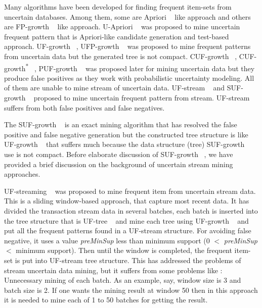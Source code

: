 \documentclass[conference]{IEEEtran}
\begin{document}
Many algorithms have been developed for finding frequent item-sets from uncertain databases. Among them, some are Apriori ~\cite{DBLP:conf/vldb/AgrawalS94} like approach and others are FP-growth ~\cite{DBLP:journals/datamine/HanPYM04} like approach. U-Apriori ~\cite{DBLP:journals/tkde/ZhaoYN14} was proposed to mine uncertain frequent pattern that is Apriori-like candidate generation and test-based approach. UF-growth ~\cite{DBLP:conf/kdd/GadeWK04}, UFP-growth ~\cite{DBLP:conf/kdd/AggarwalLWW09} was proposed to mine frequent patterns from uncertain data but the generated tree is not compact. CUF-growth ~\cite{DBLP:conf/dasfaa/LeungT12}, CUF-growth\textsuperscript{*} ~\cite{DBLP:conf/dasfaa/LeungT12}, PUF-growth ~\cite{DBLP:conf/pakdd/LeungT13} was proposed later for mining uncertain data but they produce false positives as they work with probabilistic uncertainty modeling. All of them are unable to mine stream of uncertain data. UF-stream ~\cite{DBLP:conf/icde/LeungH09} and SUF-growth ~\cite{DBLP:conf/icde/LeungH09} proposed to mine uncertain frequent pattern from stream. UF-stream ~\cite{DBLP:conf/icde/LeungH09} suffers from both false positives and false negatives. 

The SUF-growth ~\cite{DBLP:conf/icde/LeungH09} is an exact mining algorithm that has resolved the false positive and false negative generation but the constructed tree structure is like UF-growth ~\cite{DBLP:conf/kdd/GadeWK04} that suffers much because the data structure (tree) SUF-growth ~\cite{DBLP:conf/icde/LeungH09} use is not compact. Before elaborate discussion of SUF-growth ~\cite{DBLP:conf/icde/LeungH09}, we have provided a brief discussion on the background of uncertain stream mining approaches.

UF-streaming ~\cite{DBLP:conf/icde/LeungH09} was proposed to mine frequent item from uncertain stream data. This is a sliding window-based approach, that capture most recent data. It has divided the transaction stream data in several batches, each batch is inserted into the tree structure that is UF-tree ~\cite{DBLP:conf/kdd/GadeWK04} and mine each tree using UF-growth ~\cite{DBLP:conf/kdd/GadeWK04} and put all the frequent patterns found in a UF-stream structure. For avoiding false negative, it uses a value \emph{preMinSup} less than minimum support (0 $<$ \emph{preMinSup} $<$ minimum support). Then until the window is completed, the frequent item-set is put into UF-stream tree structure. This has addressed the problems of stream uncertain data mining, but it suffers from some problems like : Unnecessary mining of each batch. As an example, say, window size is 3 and batch size is 2. If one wants the mining result at window 50 then in this approach it is needed to mine each of 1 to 50 batches for getting the result.
\end{document}
